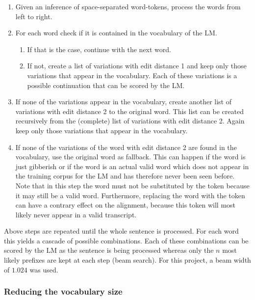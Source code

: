\begin{enumerate}
	\item Given an inference of space-separated word-tokens, process the words from left to right.
	\item For each word check if it is contained in the vocabulary of the \ac{LM}. 
	\begin{enumerate}
		\item If that is the case, continue with the next word. 
		\item If not, create a list of variations with edit distance 1 and keep only those variations that appear in the vocabulary. Each of these variations is a possible continuation that can be scored by the \ac{LM}. 
	\end{enumerate}
	\item If none of the variations appear in the vocabulary, create another list of variations with edit distance 2 to the original word. This list can be created recursively from the (complete) list of variations with edit distance 2. Again keep only those variations that appear in the vocabulary.	
	\item If none of the variations of the word with edit distance 2 are found in the vocabulary, use the original word as fallback. This can happen if the word is just gibberish or if the word is an actual valid word which does not appear in the training corpus for the \ac{LM} and has therefore never been seen before. Note that in this step the word must not be substituted by the  token because it may still be a valid word. Furthermore, replacing the word with the  token can have a contrary effect on the alignment, because this token will most likely never appear in a valid transcript. 
\end{enumerate}

Above steps are repeated until the whole sentence is processed. For each word this yields a cascade of possible combinations. Each of these combinations can be scored by the \ac{LM} as the sentence is being processed whereas only the $n$ most likely prefixes are kept at each step (beam search). For this project, a beam width of $1.024$ was used.

\subsubsection{Reducing the vocabulary size}

